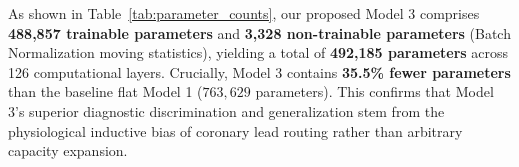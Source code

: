 \documentclass[5p,twocolumn,10pt]{elsarticle}
\begin{document}
\begin{table}[htbp]
\caption{Comprehensive Parameter Counts and Layer Complexity across Evaluated Architectures.}
\label{tab:parameter_counts}
\centering
\small
\setlength{\tabcolsep}{3.5pt}
\end{table}

As shown in Table~\ref{tab:parameter_counts}, our proposed Model 3 comprises \textbf{488,857 trainable parameters} and \textbf{3,328 non-trainable parameters} (Batch Normalization moving statistics), yielding a total of \textbf{492,185 parameters} across 126 computational layers. Crucially, Model 3 contains \textbf{35.5\% fewer parameters} than the baseline flat Model 1 ($763,629$ parameters). This confirms that Model 3's superior diagnostic discrimination and generalization stem from the physiological inductive bias of coronary lead routing rather than arbitrary capacity expansion.
\end{document}

